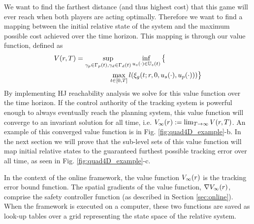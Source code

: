  We want to find the farthest distance (and thus highest cost) that this game will ever reach when both players are acting optimally. Therefore we want to find a mapping between the initial relative state of the system and the maximum possible cost achieved over the time horizon. This mapping is through our value function, defined as
 \begin{equation}
 \begin{aligned}
 \label{eq:valfunc}
 	&V(r,T)= \sup_{\gamma_{p} \in \Gamma_p(t), \gamma_{d} \in \Gamma_d(t)} \inf_{u_s(\cdot) \in \mathbb{U}_s(t)} \big\{\\
  &\qquad\qquad\qquad\qquad \max_{t\in [0, T]} l(\xi_g(t; r, 0, u_s(\cdot), u_p(\cdot)))\big\}
 	\end{aligned}
 \end{equation} 
 By implementing HJ reachability analysis we solve for this value function over the time horizon. If the control authority of the tracking system is powerful enough to always eventually reach the planning system, this value function will converge to an invariant solution for all time, i.e. $V_\infty(r) := \lim_{T\rightarrow\infty} V(r, T)$. An example of this converged value function is in Fig. \ref{fig:quad4D_example}-b. In the next section we will prove that the sub-level sets of this value function will map initial relative states to the guaranteed furthest possible tracking error over all time, as seen in Fig. \ref{fig:quad4D_example}-c.
 
In the context of the online framework, the value function $V_\infty(r)$ is the tracking error bound function. The spatial gradients of the value function, $\nabla V_\infty(r)$, comprise the safety controller function (as described in Section \ref{sec:online}). When the framework is executed on a computer, these two functions are saved as look-up tables over a grid representing the state space of the relative system.
 
